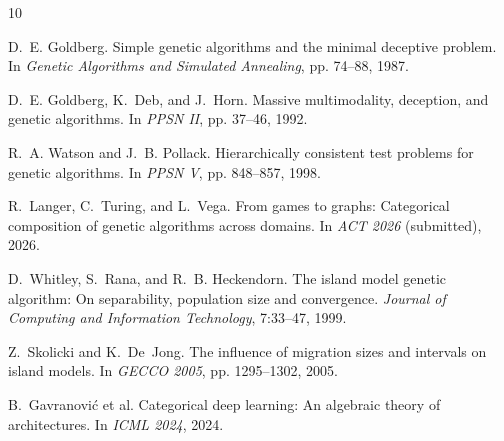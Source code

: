\documentclass[sigconf,nonacm]{acmart}
\begin{document}
\begin{thebibliography}{10}

D.~E. Goldberg.
\newblock Simple genetic algorithms and the minimal deceptive problem.
\newblock In \emph{Genetic Algorithms and Simulated Annealing}, pp. 74--88, 1987.

D.~E. Goldberg, K.~Deb, and J.~Horn.
\newblock Massive multimodality, deception, and genetic algorithms.
\newblock In \emph{PPSN II}, pp. 37--46, 1992.

R.~A. Watson and J.~B. Pollack.
\newblock Hierarchically consistent test problems for genetic algorithms.
\newblock In \emph{PPSN V}, pp. 848--857, 1998.

R.~Langer, C.~Turing, and L.~Vega.
\newblock From games to graphs: Categorical composition of genetic algorithms
  across domains.
\newblock In \emph{ACT 2026} (submitted), 2026.

D.~Whitley, S.~Rana, and R.~B. Heckendorn.
\newblock The island model genetic algorithm: On separability, population size
  and convergence.
\newblock \emph{Journal of Computing and Information Technology}, 7:33--47, 1999.

Z.~Skolicki and K.~De~Jong.
\newblock The influence of migration sizes and intervals on island models.
\newblock In \emph{GECCO 2005}, pp. 1295--1302, 2005.

B.~Gavranovi\'{c} et al.
\newblock Categorical deep learning: An algebraic theory of architectures.
\newblock In \emph{ICML 2024}, 2024.

\end{thebibliography}
\end{document}

